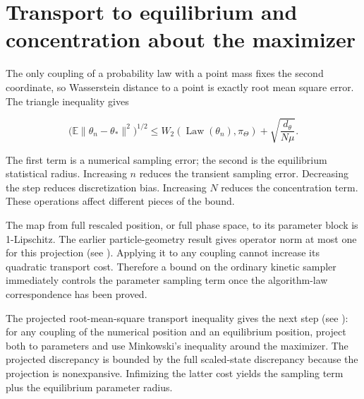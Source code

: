 \documentclass[11pt,a4paper]{article}
\begin{document}
\section{\texorpdfstring{Transport to equilibrium and concentration about the maximizer}{Transport to equilibrium and concentration about the maximizer}}


The only coupling of a probability law with a point mass fixes the second
coordinate, so Wasserstein distance to a point is exactly root mean square
error. The triangle inequality gives


\[\bigl(\mathbb E\|\theta_n-\theta_*\|^2\bigr)^{1/2}
\le W_2(\operatorname{Law}(\theta_n),\pi_\Theta)
+\sqrt{\frac{d_\theta}{N\mu}}.\]


The first term is a numerical sampling error; the second is the equilibrium
statistical radius. Increasing \(n\) reduces the transient sampling error.
Decreasing the step reduces discretization bias. Increasing \(N\) reduces
the concentration term. These operations affect different pieces of the bound.




The map from full rescaled position, or full phase space, to its parameter
block is 1-Lipschitz. The earlier particle-geometry result gives operator norm at most one for this projection (see \cite[Section~3.1.6]{LangevinLean2026IPLA}). Applying it to any coupling cannot
increase its quadratic transport cost. Therefore a bound on the ordinary
kinetic sampler immediately controls the parameter sampling term once the
algorithm-law correspondence has been proved.



The projected root-mean-square transport inequality gives the next step (see \cite[Section~3.48.9]{LangevinLean2026ULASC}): for any coupling of the numerical position and an equilibrium position, project both to parameters and use Minkowski’s inequality around the maximizer. The projected discrepancy is bounded by the full scaled-state discrepancy because the projection is nonexpansive. Infimizing the latter cost yields the sampling term plus the equilibrium parameter radius.
\end{document}
